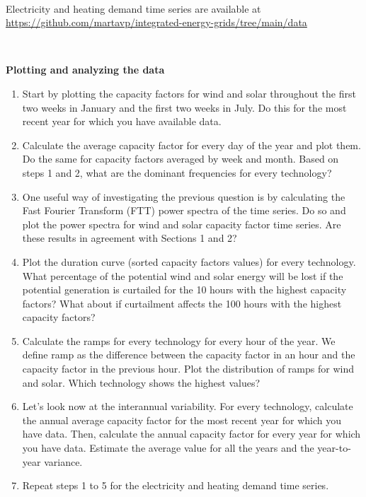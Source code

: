 \documentclass[10pt]{article}
\newenvironment{problem}[2][Problem]{\begin{trivlist}
\item[\hskip \labelsep {\bfseries #1}\hskip \labelsep {\bfseries #2.}]}{\end{trivlist}}
\begin{document}
\begin{problem}{1.1. Analyzing solar and wind generation time series}
\

Electricity and heating demand time series are available at \url{https://github.com/martavp/integrated-energy-grids/tree/main/data}

\

\textbf{Plotting and analyzing the data}

\begin{enumerate}

\item Start by plotting the capacity factors for wind and solar throughout the first two weeks in January and the first two weeks in July. Do this for the most recent year for which you have available data.  

\item Calculate the average capacity factor for every day of the year and plot them. Do the same for capacity factors averaged by week and month. Based on steps 1 and 2, what are the dominant frequencies for every technology?

\item One useful way of investigating the previous question is by calculating the Fast Fourier Transform (FTT) power spectra of the time series. Do so and plot the power spectra for wind and solar capacity factor time series. Are these results in agreement with Sections 1 and 2?

\item Plot the duration curve (sorted capacity factors values) for every technology. What percentage of the potential wind and solar energy will be lost if the potential generation is curtailed for the 10 hours with the highest capacity factors? What about if curtailment affects the 100 hours with the highest capacity factors?

\item Calculate the ramps for every technology for every hour of the year. We define ramp as the difference between the capacity factor in an hour and the capacity factor in the previous hour. Plot the distribution of ramps for wind and solar. Which technology shows the highest values?

\item Let’s look now at the interannual variability. For every technology, calculate the annual average capacity factor for the most recent year for which you have data. Then, calculate the annual capacity factor for every year for which you have data. Estimate the average value for all the years and the year-to-year variance.

\item Repeat steps 1 to 5 for the electricity and heating demand time series. 

\end{enumerate}

\end{problem}
\end{document}
